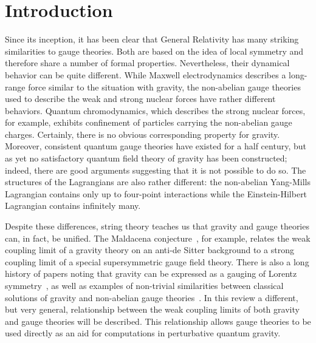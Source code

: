 
\newpage




\section{Introduction}
\label{section:Introduction}

Since its inception, it has been clear that General Relativity has
many striking similarities to gauge theories.  Both are based on the
idea of local symmetry and therefore share a number of formal
properties.  Nevertheless, their dynamical behavior can be quite
different.  While Maxwell electrodynamics describes a long-range force
similar to the situation with gravity, the non-abelian gauge theories
used to describe the weak and strong nuclear forces have rather
different behaviors.  Quantum chromodynamics, which describes the
strong nuclear forces, for example, exhibits confinement of particles
carrying the non-abelian gauge charges. Certainly, there is no obvious
corresponding property for gravity.  Moreover, consistent quantum
gauge theories have existed for a half century, but as yet no
satisfactory quantum field theory of gravity has been constructed;
indeed, there are good arguments suggesting that it is not possible to
do so.  The structures of the Lagrangians are also rather different:
the non-abelian Yang-Mills Lagrangian contains only up to four-point
interactions while the Einstein-Hilbert Lagrangian contains infinitely
many.

Despite these differences, string theory teaches us that gravity and
gauge theories can, in fact, be unified.  The Maldacena
conjecture~\cite{Maldacena98,Aharony00}, for example, relates the weak
coupling limit of a gravity theory on an anti-de Sitter background to
a strong coupling limit of a special supersymmetric gauge field
theory.  There is also a long history of papers noting that gravity
can be expressed as a gauging of Lorentz
symmetry~\cite{Utiyama56,Ivanenko83,Hehl95}, as well as examples
of non-trivial similarities between classical solutions of gravity and
non-abelian gauge theories~\cite{Singleton99}.
In this review a different, but very general, relationship between the
weak coupling limits of both gravity and gauge theories will be
described.  This relationship allows gauge theories to be used
directly as an aid for computations in perturbative quantum gravity.

